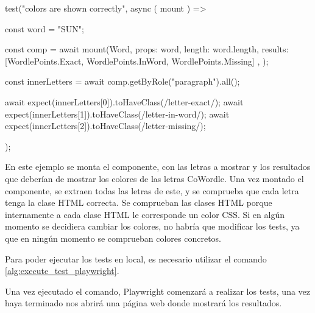 \begin{mytypescript}[float={!h},caption={Ejemplo test colores.},label={alg:test_colors}]
	test("colors are shown correctly", async ({ mount }) => {
		const word = "SUN";


		const comp = await mount(Word, {
			props: {
				word,
				length: word.length,
				results: [WordlePoints.Exact, WordlePoints.InWord, WordlePoints.Missing]
			},
		});


		const innerLetters = await comp.getByRole("paragraph").all();


		await expect(innerLetters[0]).toHaveClass(/letter-exact/);
		await expect(innerLetters[1]).toHaveClass(/letter-in-word/);
		await expect(innerLetters[2]).toHaveClass(/letter-missing/);
	});
\end{mytypescript}

En este ejemplo se monta el componente, con las letras a mostrar y los resultados que deberían de mostrar los colores de las letras CoWordle. Una vez montado el componente, se extraen todas las letras de este, y se comprueba que cada letra tenga la clase HTML correcta. Se comprueban las clases HTML porque internamente a cada clase HTML le corresponde un color CSS. Si en algún momento se decidiera cambiar los colores, no habría que modificar los tests, ya que en ningún momento se comprueban colores concretos.

Para poder ejecutar los tests en local, es necesario utilizar el comando \ref{alg:execute_test_playwright}.


Una vez ejecutado el comando, Playwright comenzará a realizar los tests, una vez haya terminado nos abrirá una página web donde mostrará los resultados.

